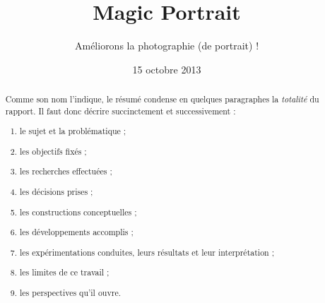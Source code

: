 \documentclass[11pt, french]{report-rd-info}
\begin{document}
\title{Magic Portrait}
\subtitle{Améliorons la photographie (de portrait) !}
\date{15 octobre 2013}


\begin{abstract}
Comme son nom l'indique, le résumé condense en quelques paragraphes
la \emph{totalité} du rapport. Il faut donc décrire succinctement et
successivement :
\begin{enumerate}
   \item le sujet et la problématique ;
   \item les objectifs fixés ;
   \item les recherches effectuées ;
   \item les décisions prises ;
   \item les constructions conceptuelles ;
   \item les développements accomplis ;
   \item les expérimentations conduites, leurs résultats et leur interprétation ;
   \item les limites de ce travail ;
   \item les perspectives qu'il ouvre.
\end{enumerate}
\end{abstract}
\end{document}
